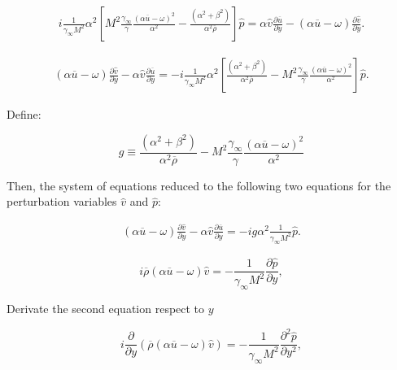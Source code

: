 \begin{equation*} 
\begin{split}
i
\frac{1}{\gamma_{\infty} M^{2}}
\alpha^2
\left[
M^{2}
\frac{\gamma_\infty}{\gamma}
\frac{(\alpha\overline{u}-\omega )^2}
{\alpha^2}
-
\frac{(\alpha^2+\beta^2)}{\alpha^2\overline{\rho}}
\right]
\hat{p}
=
\alpha
\hat{v}
\frac{\partial\overline{u}}{\partial y}
-
(\alpha\overline{u}-\omega)
\frac{\partial \hat{v}}{\partial y}
.
\end{split}
\end{equation*} 

\begin{equation*} 
\begin{split}
(\alpha\overline{u}-\omega)
\frac{\partial \hat{v}}{\partial y}
-
\alpha
\hat{v}
\frac{\partial\overline{u}}{\partial y}
=
-
i
\frac{1}{\gamma_{\infty} M^{2}}
\alpha^2
\left[
\frac{(\alpha^2+\beta^2)}{\alpha^2\overline{\rho}}
-
M^{2}
\frac{\gamma_\infty}{\gamma}
\frac{(\alpha\overline{u}-\omega )^2}
{\alpha^2}
\right]
\hat{p}
.
\end{split}
\end{equation*} 

Define: 

\begin{equation} 
g\equiv
\frac{(\alpha^2+\beta^2)}{\alpha^2\overline{\rho}}
-
M^{2}
\frac{\gamma_\infty}{\gamma}
\frac{(\alpha\overline{u}-\omega )^2}
{\alpha^2}
\end{equation} 

Then, the system of equations reduced to the following two equations for the perturbation variables $\hat{v}$ and $\hat{p}$:

\begin{equation} 
\begin{split}
(\alpha\overline{u}-\omega)
\frac{\partial \hat{v}}{\partial y}
-
\alpha
\hat{v}
\frac{\partial\overline{u}}{\partial y}
=
-
i
g\alpha^2
\frac{1}{\gamma_{\infty} M^{2}}
\hat{p}
.
\end{split}
\end{equation} 

\begin{equation*} 
i
\overline{\rho}
\left(
\alpha 
\overline{u}
-
\omega 
\right)
\hat{v}
=
-
\frac{1}{\gamma_{\infty} M^{2}}
\frac{\partial \hat{p}}{\partial y}
,
\end{equation*} 

Derivate the second equation respect to $y$ 

\begin{equation*} 
i
\frac{\partial }{\partial y}
\left(
\overline{\rho}
\left(
\alpha 
\overline{u}
-
\omega 
\right)
\hat{v}
\right)
=
-
\frac{1}{\gamma_{\infty} M^{2}}
\frac{\partial^2 \hat{p}}{\partial y^2}
,
\end{equation*} 

